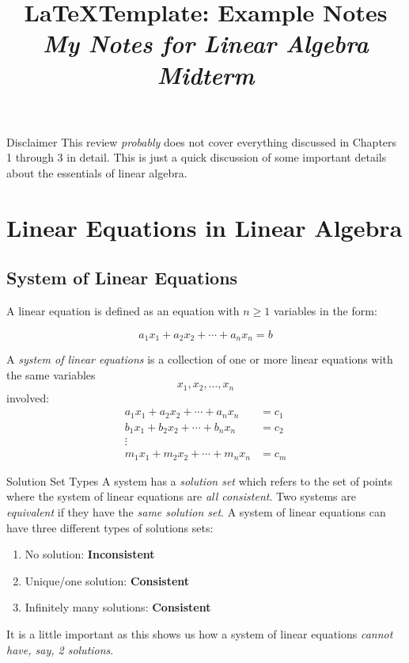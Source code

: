 \documentclass{article}
\title{\LaTeX Template: Example Notes \\ \textit{My Notes for Linear Algebra Midterm}}
\begin{document}
\maketitle

\begin{boxcontainer}{Disclaimer}
	This review \emph{probably} does not cover everything discussed in Chapters 1 through 3 in detail. This is just a quick discussion of some important details about the essentials of linear algebra.
\end{boxcontainer}

\section{Linear Equations in Linear Algebra}

\subsection{System of Linear Equations}
A linear equation is defined as an equation with $n  \geq 1$ variables in the form:

\begin{equation}
	a_1x_1 + a_2x_2 + \cdots + a_nx_n = b
\end{equation}

A \emph{system of linear equations} is a collection of one or more linear equations with the same variables
$$
	x_1, x_2, \ldots, x_n
$$
involved:
\begin{equation}
	\begin{split}
		a_1x_1 + a_2x_2 + \cdots + a_nx_n & = c_1 \\
		b_1x_1 + b_2x_2 + \cdots + b_nx_n & = c_2 \\
		\vdots                            &       \\
		m_1x_1 + m_2x_2 + \cdots + m_nx_n & = c_m
	\end{split}
\end{equation}


\begin{boxcontainer}{Solution Set Types}
	A system has a \emph{solution set} which refers to the set of points where the system of linear equations are \emph{all consistent}. Two systems are \emph{equivalent} if they have the \emph{same solution set}. A system of linear equations can have three different types of solutions sets:
	\begin{enumerate}[label=\arabic*.]
		\item No solution: \textbf{Inconsistent}
		\item Unique/one solution: \textbf{Consistent}
		\item Infinitely many solutions: \textbf{Consistent}
	\end{enumerate}
	It is a little important as this shows us how a system of linear equations \emph{cannot have, say, 2 solutions}.
\end{boxcontainer}
\end{document}
